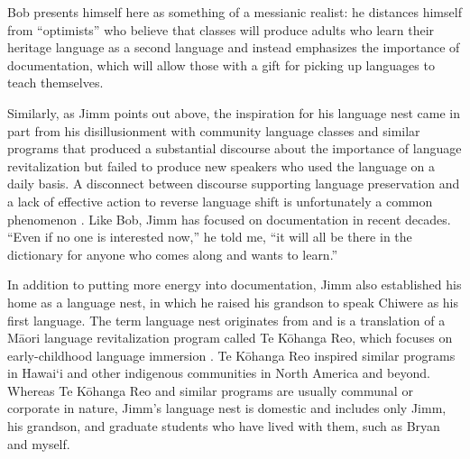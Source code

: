 \documentclass[output=paper]{LSP/langsci}
\begin{document}
Bob presents himself here as something of a messianic realist: he distances himself from ``optimists'' who believe that classes will produce adults who learn their heritage language as a second language and instead emphasizes the importance of documentation, which will allow those with a gift for picking up languages to teach themselves. 

Similarly, as Jimm points out above, the inspiration for his language nest came in part from his disillusionment with community language classes and similar programs that produced a substantial discourse about the importance of language revitalization but failed to produce new speakers who used the language on a daily basis. A disconnect between discourse supporting language preservation and a lack of effective action to reverse language shift is unfortunately a common phenomenon \citep[see e.g.][]{DauenhauerDauenhauer1998}. Like Bob, Jimm has focused on documentation in recent decades. ``Even if no one is interested now,'' he told me, ``it will all be there in the dictionary for anyone who comes along and wants to learn.''

In addition to putting more energy into documentation, Jimm also established his home as a language nest, in which he raised his grandson to speak Chiwere as his first language. The term language nest originates from and is a translation of a M\=aori language revitalization program called Te K\=ohanga Reo, which focuses on early-childhood language immersion \citep{King2008}. Te K\=ohanga Reo inspired similar programs in Hawai`i \citep{Warner2008, WilsonKamana2008} and other indigenous communities in North America and beyond. Whereas Te K\=ohanga Reo and similar programs are usually communal or corporate in nature, Jimm's language nest is domestic and includes only Jimm, his grandson, and graduate students who have lived with them, such as Bryan and myself.
\end{document}
